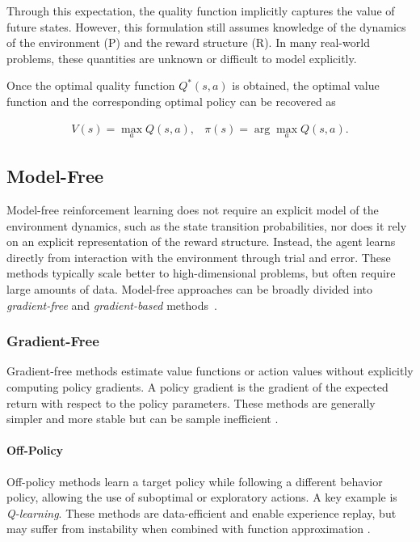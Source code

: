 Through this expectation, the quality function implicitly captures the value of future states. However, this formulation still assumes knowledge of the dynamics of the environment (P) and the reward structure (R). In many real-world problems, these quantities are unknown or difficult to model explicitly.

Once the optimal quality function \( Q^\ast(s,a) \) is obtained, the optimal value function and the corresponding optimal policy can be recovered as~\cite{brunton2022data}

\[
\begin{array}{cc}
V(s) = \max_{a} Q(s,a), & \pi(s) = \arg\max_{a} Q(s,a).
\end{array}
\]



\subsection{Model-Free}
Model-free reinforcement learning does not require an explicit model of the environment dynamics, such as the state transition probabilities, nor does it rely on an explicit representation of the reward structure. Instead, the agent learns directly from interaction with the environment through trial and error. These methods typically scale better to high-dimensional problems, but often require large amounts of data. Model-free approaches can be broadly divided into \emph{gradient-free} and \emph{gradient-based} methods~\cite{brunton2022data}.


\subsubsection{Gradient-Free}
Gradient-free methods estimate value functions or action values without explicitly computing policy gradients. A policy gradient is the gradient of the expected return with respect to the policy parameters. These methods are generally simpler and more stable but can be sample inefficient \cite{brunton2022data}.


\paragraph{Off-Policy}
Off-policy methods learn a target policy while following a different behavior policy, allowing the use of suboptimal or exploratory actions. A key example is \emph{Q-learning}. These methods are data-efficient and enable experience replay, but may suffer from instability when combined with function approximation \cite{brunton2022data}.


